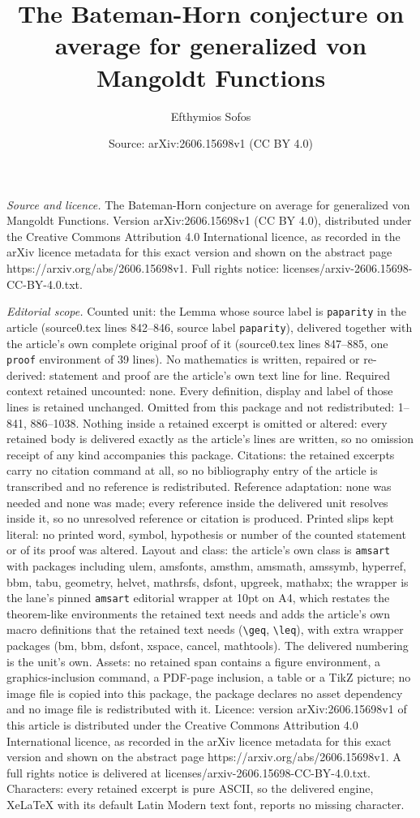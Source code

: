 \documentclass[10pt,a4paper]{amsart}
\title[The Bateman-Horn conjecture on average for generalized von M]{The Bateman-Horn conjecture on average for generalized von Mangoldt Functions}
\author{Efthymios Sofos}
\date{Source: arXiv:2606.15698v1 (CC BY 4.0)}
\begin{document}
\maketitle

\noindent\emph{Source and licence.} The Bateman-Horn conjecture on average for generalized von Mangoldt Functions. Version arXiv:2606.15698v1 (CC BY 4.0), distributed under the Creative Commons Attribution 4.0 International licence, as recorded in the arXiv licence metadata for this exact version and shown on the abstract page https://arxiv.org/abs/2606.15698v1. Full rights notice: licenses/arxiv-2606.15698-CC-BY-4.0.txt.\par\smallskip

\noindent\textit{Editorial scope.} Counted unit: the Lemma whose source label is \texttt{paparity} in the article (source0.tex lines 842--846, source label \texttt{paparity}), delivered together with the article's own complete original proof of it (source0.tex lines 847--885, one \texttt{proof} environment of 39 lines). No mathematics is written, repaired or re-derived: statement and proof are the article's own text line for line. Required context retained uncounted: none. Every definition, display and label of those lines is retained unchanged. Omitted from this package and not redistributed: 1--841, 886--1038. Nothing inside a retained excerpt is omitted or altered: every retained body is delivered exactly as the article's lines are written, so no omission receipt of any kind accompanies this package. Citations: the retained excerpts carry no citation command at all, so no bibliography entry of the article is transcribed and no reference is redistributed. Reference adaptation: none was needed and none was made; every reference inside the delivered unit resolves inside it, so no unresolved reference or citation is produced. Printed slips kept literal: no printed word, symbol, hypothesis or number of the counted statement or of its proof was altered. Layout and class: the article's own class is \texttt{amsart} with packages including ulem, amsfonts, amsthm, amsmath, amssymb, hyperref, bbm, tabu, geometry, helvet, mathrsfs, dsfont, upgreek, mathabx; the wrapper is the lane's pinned \texttt{amsart} editorial wrapper at 10pt on A4, which restates the theorem-like environments the retained text needs and adds the article's own macro definitions that the retained text needs (\texttt{\textbackslash geq}, \texttt{\textbackslash leq}), with extra wrapper packages (bm, bbm, dsfont, xspace, cancel, mathtools). The delivered numbering is the unit's own. Assets: no retained span contains a figure environment, a graphics-inclusion command, a PDF-page inclusion, a table or a TikZ picture; no image file is copied into this package, the package declares no asset dependency and no image file is redistributed with it. Licence: version arXiv:2606.15698v1 of this article is distributed under the Creative Commons Attribution 4.0 International licence, as recorded in the arXiv licence metadata for this exact version and shown on the abstract page https://arxiv.org/abs/2606.15698v1. A full rights notice is delivered at licenses/arxiv-2606.15698-CC-BY-4.0.txt. Characters: every retained excerpt is pure ASCII, so the delivered engine, XeLaTeX with its default Latin Modern text font, reports no missing character.
\end{document}
